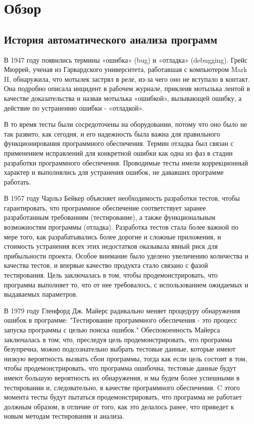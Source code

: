 \chapter{Обзор}\label{ch:ch1}

\section{История автоматического анализа программ}\label{sec:ch1/sec1}
В 1947 году появились термины «ошибка» (bug) и «отладка» (debugging). Грейс Мюррей, 
ученая из Гарвардского университета, работавшая с компьютером Mark II, обнаружила, 
что мотылек застрял в реле, из-за чего оно не вступало в контакт. Она подробно 
описала инцидент в рабочем журнале, приклеив мотылька лентой в качестве доказательства и 
назвав мотылька «ошибкой», вызывающей ошибку, а действие по устранению ошибки - «отладкой».

В то время тесты были сосредоточены на оборудовании, потому что оно было не так развито, как 
сегодня, и его надежность была важна для правильного функционирования программного обеспечения.
Термин отладка был связан с применением исправлений для конкретной ошибки как одна из фаз в 
стадии разработки программного обеспечения. Проводимые тесты имели коррекционный характер и 
выполнялись для устранения ошибок, не дававших программе работать. 

В 1957 году Чарльз Бейкер объясняет необходимость разработки тестов, чтобы гарантировать, что 
программное обеспечение соответствует заранее разработанным требованиям (тестирование), а также 
функциональным возможностям программы (отладка)\cite{Baker}. Разработка тестов стала более важной по мере 
того, как разрабатывались более дорогие и сложные приложения, и стоимость устранения всех этих 
недостатков оказывала явный риск для прибыльности проекта. Особое внимание было уделено 
увеличению количества и качества тестов, и впервые качество продукта стало связано с фазой 
тестирования. Цель заключалась в том, чтобы продемонстрировать, что программа выполняет то, что 
от нее требовалось, с использованием ожидаемых и выдаваемых параметров.

В 1979 году Гленфорд Дж. Майерс радикально меняет процедуру обнаружения ошибок в программе:
"Тестирование программного обеспечения - это процесс запуска программы с целью поиска ошибок."\cite{Myers1979}
Обеспокоенность Майерса заключалась в том, что, преследуя цель продемонстрировать, что программа 
безупречна, можно подсознательно выбрать тестовые данные, которые имеют низкую вероятность 
вызвать сбои программы, тогда как если цель состоит в том, чтобы продемонстрировать, что 
программа ошибочна, тестовые данные будут имеют большую вероятность их обнаружения, и мы будем 
более успешными в тестировании и, следовательно, в качестве программного обеспечения. C этого
момента тесты будут пытаться продемонстрировать, что программа не работает должным образом, в 
отличие от того, как это делалось ранее, что приведет к новым методам тестирования и анализа.

